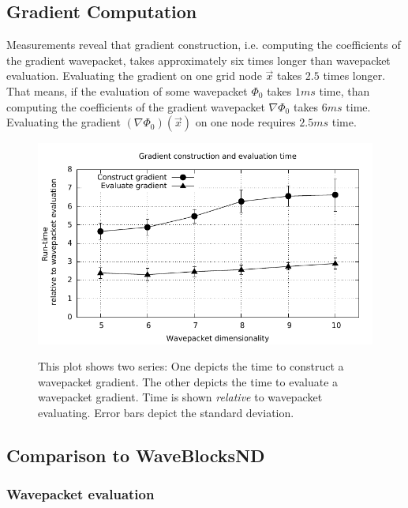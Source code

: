 \documentclass{article}
\begin{document}
\subsection{Gradient Computation}

Measurements reveal that gradient construction, i.e. computing the coefficients
of the gradient wavepacket, takes approximately six times longer than wavepacket evaluation.
Evaluating the gradient on one grid node \(\vec{x}\) takes \(2.5\) times longer.
That means, if the evaluation of some wavepacket \(\Phi_0\) takes \(1 ms\) time, than
computing the coefficients of the gradient wavepacket \(\nabla\Phi_0\) takes \(6ms\) time.
Evaluating the gradient \((\nabla \Phi_0)(\vec{x})\) on one node requires \(2.5 ms\) time.

\begin{figure}[H]
  \centering
  \includegraphics[width=1.0\textwidth]{plots/grad_reltime}
  \label{fig:grad_reltime}
  \caption{
    This plot shows two series: One depicts the time to construct a wavepacket gradient.
    The other depicts the time to evaluate a wavepacket gradient.
    Time is shown \emph{relative} to wavepacket evaluating.
    Error bars depict the standard deviation.
  }
\end{figure}

\subsection{Comparison to WaveBlocksND}

\subsubsection{Wavepacket evaluation}
\end{document}
